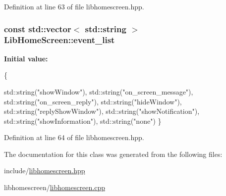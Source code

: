 Definition at line 63 of file libhomescreen.\+hpp.

\subsubsection[{\texorpdfstring{event\+\_\+list}{event_list}}]{\setlength{\rightskip}{0pt plus 5cm}const std\+::vector$<$ std\+::string $>$ Lib\+Home\+Screen\+::event\+\_\+list\hspace{0.3cm}{\ttfamily [static]}}\hypertarget{class_lib_home_screen_a6a6d8a4d33a006a08652e7377a4c29e9}{}\label{class_lib_home_screen_a6a6d8a4d33a006a08652e7377a4c29e9}
{\bfseries Initial value\+:}
\begin{DoxyCode}
\{

    std::string(\textcolor{stringliteral}{"showWindow"}),
    std::string(\textcolor{stringliteral}{"on\_screen\_message"}),
    std::string(\textcolor{stringliteral}{"on\_screen\_reply"}),
    std::string(\textcolor{stringliteral}{"hideWindow"}),
    std::string(\textcolor{stringliteral}{"replyShowWindow"}),
    std::string(\textcolor{stringliteral}{"showNotification"}),
    std::string(\textcolor{stringliteral}{"showInformation"}),
    std::string(\textcolor{stringliteral}{"none"})
\}
\end{DoxyCode}


Definition at line 64 of file libhomescreen.\+hpp.



The documentation for this class was generated from the following files\+:\begin{DoxyCompactItemize}
\item 
include/\hyperlink{libhomescreen_8hpp}{libhomescreen.\+hpp}\item 
libhomescreen/\hyperlink{libhomescreen_8cpp}{libhomescreen.\+cpp}\end{DoxyCompactItemize}
